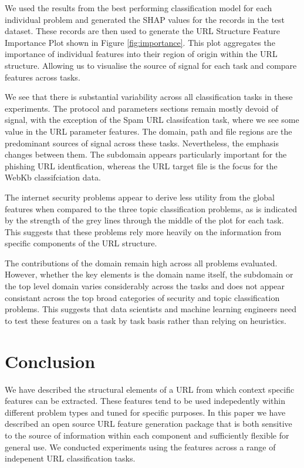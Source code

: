 \documentclass[sigconf]{acmart}
\begin{document}
We used the results from the best performing classification model for each individual problem and generated
the SHAP values for the records in the test dataset. These records are then used to generate the URL Structure 
Feature Importance Plot shown in Figure \ref{fig:importance}. This plot aggregates the importance of individual
features into their region of origin within the URL structure. Allowing us to visualise the source of signal for
each task and compare features across tasks.

We see that there is substantial variability across all classification tasks in these experiments.
The protocol and parameters sections remain mostly devoid of signal, with the exception of the Spam URL classifcation
task, where we see some value in the URL parameter features. The domain, path and file regions are the predominant sources
of signal across these tasks. Nevertheless, the emphasis changes between them. The subdomain appears particularly
important for the phishing URL identfication, whereas the URL target file is the focus for the WebKb classifciation data.

The internet security problems appear to derive less utility from the global features when compared to the three
topic classification problems, as is indicated by the strength of the grey lines through the middle of the plot 
for each task. This suggests that these problems rely more heavily on the information from specific components
of the URL structure.

The contributions of the domain remain high across all problems evaluated. However, whether the key elements is the
domain name itself, the subdomain or the top level domain varies considerably across the tasks and does
not appear consistant across the top broad categories of security and topic classification problems. 
This suggests that data scientists and machine learning engineers
need to test these features on a task by task basis rather than relying on heuristics.


\section{Conclusion}

We have described the structural elements of a URL from which context specific features can be extracted.
These features tend to be used indepedently within different problem types and tuned for specific purposes. 
In this paper we have described an open source URL feature generation package that is both sensitive to the 
source of information within each component and sufficiently flexible for general use. We conducted experiments
using the features across a range of indepenent URL classification tasks. 
\end{document}
